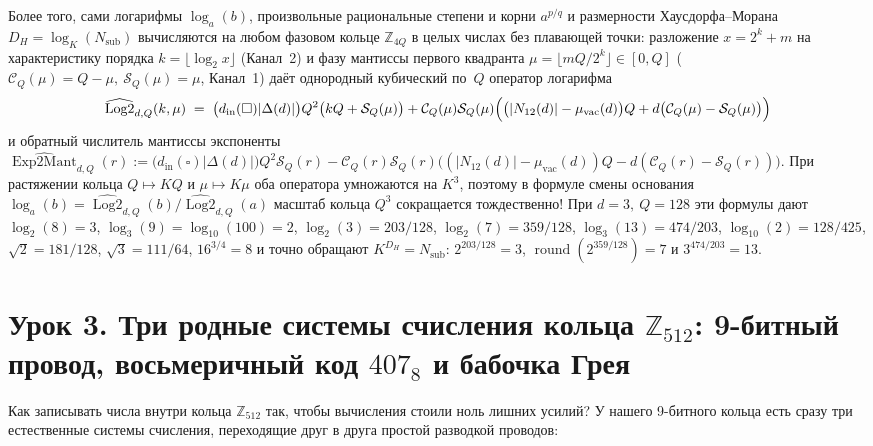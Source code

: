 Более того, сами логарифмы $\log_a(b)$, произвольные рациональные степени и корни $a^{p/q}$ и размерности Хаусдорфа--Морана $D_H = \log_K(N_{\mathrm{sub}})$ вычисляются на любом фазовом кольце $\mathbb{Z}_{4Q}$ в целых числах без плавающей точки: разложение $x = 2^k + m$ на характеристику порядка $k = \lfloor\log_2 x\rfloor$ (Канал~2) и фазу мантиссы первого квадранта $\mu = \lfloor m Q / 2^k\rfloor\in[0,Q]$ ($\mathcal{C}_Q(\mu)=Q-\mu,\ \mathcal{S}_Q(\mu)=\mu$, Канал~1) даёт однородный кубический по~$Q$ оператор логарифма
\[
  \widehat{\operatorname{Log2}}_{d,Q}(k,\mu) \;=\; \bigl(d_{\mathrm{in}}(\square)|\Delta(d)|\bigr)Q^2\bigl(k Q + \mathcal{S}_Q(\mu)\bigr) + \mathcal{C}_Q(\mu)\mathcal{S}_Q(\mu)\Bigl(\bigl(|N_{12}(d)|-\mu_{\mathrm{vac}}(d)\bigr)Q + d\bigl(\mathcal{C}_Q(\mu)-\mathcal{S}_Q(\mu)\bigr)\Bigr)
\]
и обратный числитель мантиссы экспоненты $\widehat{\operatorname{Exp2Mant}}_{d,Q}(r) := \bigl(d_{\mathrm{in}}(\square)|\Delta(d)|\bigr)Q^2\mathcal{S}_Q(r) - \mathcal{C}_Q(r)\mathcal{S}_Q(r)\bigl((|N_{12}(d)|-\mu_{\mathrm{vac}}(d))Q - d(\mathcal{C}_Q(r)-\mathcal{S}_Q(r))\bigr)$. При растяжении кольца $Q \mapsto KQ$ и $\mu \mapsto K\mu$ оба оператора умножаются на $K^3$, поэтому в формуле смены основания $\log_a(b) = \widehat{\operatorname{Log2}}_{d,Q}(b)/\widehat{\operatorname{Log2}}_{d,Q}(a)$ масштаб кольца $Q^3$ сокращается тождественно! При $d=3,\ Q=128$ эти формулы дают $\log_2(8)=3$, $\log_3(9)=\log_{10}(100)=2$, $\log_2(3)=203/128$, $\log_2(7)=359/128$, $\log_3(13)=474/203$, $\log_{10}(2)=128/425$, $\sqrt{2}=181/128$, $\sqrt{3}=111/64$, $16^{3/4}=8$ и точно обращают $K^{D_H} = N_{\mathrm{sub}}$: $2^{203/128}=3$, $\operatorname{round}(2^{359/128})=7$ и $3^{474/203}=13$.

\section{Урок 3. Три родные системы счисления кольца \texorpdfstring{$\mathbb{Z}_{512}$}{Z\_512}: 9-битный провод, восьмеричный код \texorpdfstring{$407_8$}{407\_8} и бабочка Грея}

Как записывать числа внутри кольца $\mathbb{Z}_{512}$ так, чтобы вычисления стоили ноль лишних усилий? У нашего 9-битного кольца есть сразу три естественные системы счисления, переходящие друг в друга простой разводкой проводов:

